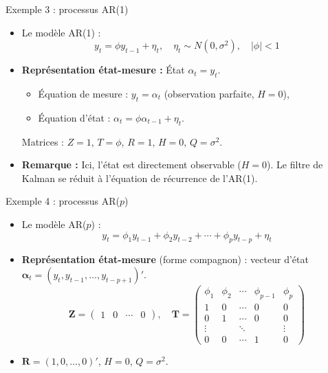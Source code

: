 \documentclass[11pt,aspectratio=169]{beamer}
\begin{document}
\begin{frame}{Exemple 3 : processus AR(1)}

\begin{itemize}

\item Le modèle AR(1) :
  \[
  y_t = \phi y_{t-1} + \eta_t, \quad \eta_t \sim N(0, \sigma^2), \quad |\phi| < 1
  \]\newline

\item \textbf{Représentation état-mesure :} État $\alpha_t = y_t$.
  \begin{itemize}
  \item Équation de mesure : $y_t = \alpha_t$ (observation parfaite, $H = 0$),
  \item Équation d'état : $\alpha_t = \phi \alpha_{t-1} + \eta_t$.
  \end{itemize}
  Matrices : $Z = 1$, $T = \phi$, $R = 1$, $H = 0$, $Q = \sigma^2$.\newline

\item \textbf{Remarque :} Ici, l'état est directement observable ($H = 0$). Le filtre de Kalman se réduit à l'équation de récurrence de l'AR(1).

\end{itemize}

\end{frame}

\begin{frame}{Exemple 4 : processus AR($p$)}

\begin{itemize}

\item Le modèle AR($p$) :
  \[
  y_t = \phi_1 y_{t-1} + \phi_2 y_{t-2} + \cdots + \phi_p y_{t-p} + \eta_t
  \]\newline

\item \textbf{Représentation état-mesure} (forme compagnon) : vecteur d'état $\bm{\alpha}_t = (y_t, y_{t-1}, \ldots, y_{t-p+1})'$.
  \[
  \bm{Z} = \begin{pmatrix} 1 & 0 & \cdots & 0 \end{pmatrix}, \quad
  \bm{T} = \begin{pmatrix}
      \phi_1 & \phi_2 & \cdots & \phi_{p-1} & \phi_p \\
      1 & 0 & \cdots & 0 & 0 \\
      0 & 1 & \cdots & 0 & 0 \\
      \vdots & & \ddots & & \vdots \\
      0 & 0 & \cdots & 1 & 0
  \end{pmatrix}
  \]\newline

\item $\bm{R} = (1, 0, \ldots, 0)'$, $H = 0$, $Q = \sigma^2$.

\end{itemize}

\end{frame}
\end{document}

